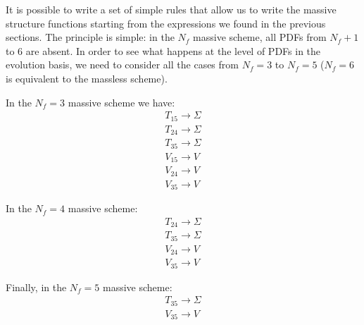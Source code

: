 \documentclass[10pt,a4paper]{article}
\begin{document}
It is possible to write a set of simple rules that allow us to write
the massive structure functions starting from the expressions we found
in the previous sections. The principle is simple: in the $N_f$
massive scheme, all PDFs from $N_f+1$ to 6 are absent. In order to see
what happens at the level of PDFs in the evolution basis, we need to
consider all the cases from $N_f=3$ to $N_f=5$ ($N_f=6$ is equivalent
to the massless scheme).

In the $N_f=3$ massive scheme we have:
\begin{equation}
\begin{array}{l}
T_{15}\rightarrow \Sigma\\
T_{24}\rightarrow \Sigma\\
T_{35}\rightarrow \Sigma\\
V_{15}\rightarrow V\\
V_{24}\rightarrow V\\
V_{35}\rightarrow V
\end{array}
\end{equation}

In the $N_f=4$ massive scheme:
\begin{equation}
\begin{array}{l}
T_{24}\rightarrow \Sigma\\
T_{35}\rightarrow \Sigma\\
V_{24}\rightarrow V\\
V_{35}\rightarrow V
\end{array}
\end{equation}

Finally, in the $N_f=5$ massive scheme:
\begin{equation}
\begin{array}{l}
T_{35}\rightarrow \Sigma\\
V_{35}\rightarrow V
\end{array}
\end{equation}
\end{document}

